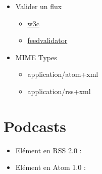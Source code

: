 \begin{itemize}
\tightlist
\item
  Valider un flux

  \begin{itemize}
  \tightlist
  \item
    \href{http://validator.w3.org/feed/}{w3c}
  \item
    \href{http://www.feedvalidator.org/}{feedvalidator}
  \end{itemize}
\item
  MIME Types

  \begin{itemize}
  \tightlist
  \item
    application/atom+xml
  \item
    application/rss+xml
  \end{itemize}
\end{itemize}

\hypertarget{podcasts}{%
\section{Podcasts}\label{podcasts}}

\begin{itemize}
\tightlist
\item
  Elément en RSS 2.0 :
\end{itemize}

\begin{otherlanguage}{english}

\begin{Shaded}
\begin{Highlighting}[]

\KeywordTok{/>}

\KeywordTok{>}
\end{Highlighting}
\end{Shaded}

\end{otherlanguage}

\begin{itemize}
\tightlist
\item
  Elément en Atom 1.0 :
\end{itemize}

